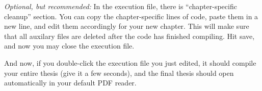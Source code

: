 \documentclass[12pt]{report} %
\begin{document}
\textit{Optional, but recommended:} In the execution file, there is ``chapter-specific cleanup'' section. You can copy the chapter-specific lines of code, paste them in a new line, and edit them accordingly for your new chapter. This will make sure that all auxilary files are deleted after the code has finished compiling. Hit save, and now you may close the execution file.

And now, if you double-click the execution file you just edited, it should compile your entire thesis (give it a few seconds), and the final thesis should open automatically in your default PDF reader.
\end{document}
